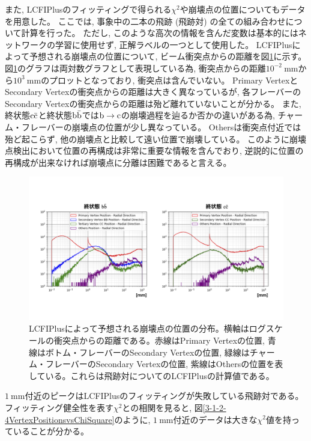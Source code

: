 また, LCFIPlusのフィッティングで得られる$\chi^2$や崩壊点の位置についてもデータを用意した。
ここでは, 事象中の二本の飛跡 (飛跡対) の全ての組み合わせについて計算を行った。
ただし, このような高次の情報を含んだ変数は基本的にはネットワークの学習に使用せず, 正解ラベルの一つとして使用した。
LCFIPlusによって予想される崩壊点の位置について, ビーム衝突点からの距離を図\ref{3-1-2-3VertexPositions}に示す。
図\ref{3-1-2-3VertexPositions}のグラフは両対数グラフとして表現している為, 衝突点からの距離$10^{-2}\ \mathrm{mm}$から$10^{3}\ \mathrm{mm}$のプロットとなっており, 衝突点は含んでいない。
Primary VertexとSecondary Vertexの衝突点からの距離は大きく異なっているが, 各フレーバーのSecondary Vertexの衝突点からの距離は殆ど離れていないことが分かる。
また, 終状態$\rm c\bar{c}$と終状態$\rm b\bar{b}$では$\rm b \to c$の崩壊過程を辿るか否かの違いがある為, チャーム・フレーバーの崩壊点の位置が少し異なっている。
Othersは衝突点付近では殆ど起こらず, 他の崩壊点と比較して遠い位置で崩壊している。
このように崩壊点検出において位置の再構成は非常に重要な情報を含んでおり, 逆説的に位置の再構成が出来なければ崩壊点に分離は困難であると言える。

\begin{figure}[htbp]
 \centering
 \includegraphics[trim = 50 100 50 150, width=1.0\textwidth, clip]{Figure/3Networks/3-1-2-3VertexPositions.png}
 \caption[LCFIPlusによって予想される崩壊点の位置の分布]{LCFIPlusによって予想される崩壊点の位置の分布。横軸はログスケールの衝突点からの距離である。赤線はPrimary Vertexの位置, 青線はボトム・フレーバーのSecondary Vertexの位置, 緑線はチャーム・フレーバーのSecondary Vertexの位置, 紫線はOthersの位置を表している。これらは飛跡対についてのLCFIPlusの計算値である。}
 \label{3-1-2-3VertexPositions}
\end{figure}

$1\ \mathrm{mm}$付近のピークはLCFIPlusのフィッティングが失敗している飛跡対である。
フィッティング健全性を表す$\chi^2$との相関を見ると, 図\ref{3-1-2-4VertexPositionsvsChiSquare}のように, $1\ \mathrm{mm}$付近のデータは大きな$\chi^2$値を持っていることが分かる。

